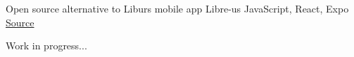 \begin{cventries}

  \cventry
    {Open source alternative to Liburs mobile app} %
    {Libre-us} %
    {JavaScript, React, Expo} %
    {\href{https://github.com/rustysnek/libre-us}{\faGithubSquare\acvHeaderIconSep Source}} %
    {
      \begin{cvitems} %
        \item {Work in progress...}
      \end{cvitems}
    } %



\end{cventries}
